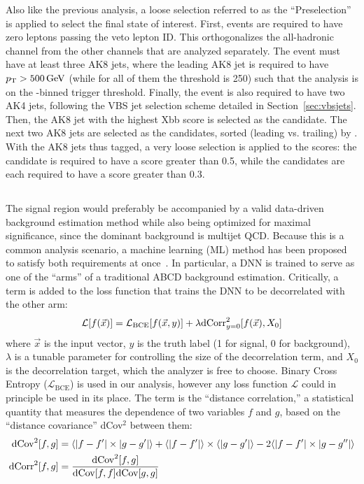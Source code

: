 Also like the previous analysis, a loose selection referred to as the ``Preselection'' is applied to select the final state of interest. 
First, events are required to have zero leptons passing the veto lepton ID. 
This orthogonalizes the all-hadronic channel from the other channels that are analyzed separately. 
The event must have at least three AK8 jets, where the leading AK8 jet is required to have $p_{\mathrm{T}} > 500\,\text{Ge\hspace{-.08em}V}$ (while for all of them the \pt threshold is 250\GeV) such that the analysis is on the \HT-binned trigger threshold. 
Finally, the event is also required to have two AK4 jets, following the VBS jet selection scheme detailed in Section~\ref{sec:vbsjets}.
Then, the AK8 jet with the highest \ParticleNet Xbb score is selected as the \Htobb candidate. 
The next two AK8 jets are selected as the \Vtoqq candidates, sorted (leading vs. trailing) by \pt.
With the AK8 jets thus tagged, a very loose selection is applied to the \ParticleNet scores: the \Htobb candidate is required to have a \ParticleNet \Xtobb score greater than 0.5, while the \Vtoqq candidates are each required to have a \ParticleNet \XWtoqq score greater than 0.3.

\subsection{\ABCDNet}
The signal region would preferably be accompanied by a valid data-driven background estimation method while also being optimized for maximal significance, since the dominant background is multijet QCD.
Because this is a common analysis scenario, a machine learning (ML) method has been proposed to satisfy both requirements at once~\cite{AutoABCD}. 
In particular, a DNN is trained to serve as one of the ``arms'' of a traditional ABCD background estimation. 
Critically, a \dCorrSq term is added to the loss function that trains the DNN to be decorrelated with the other arm:
\begin{equation}
    \mathcal{L}[f(\vec{x})] = \mathcal{L}_\mathrm{BCE}[f(\vec{x}, y)] + \lambda\text{dCorr}^2_{y=0}[f(\vec{x}), X_0]
\end{equation}
where $\vec{x}$ is the input vector, $y$ is the truth label (1 for signal, 0 for background), $\lambda$ is a tunable parameter for controlling the size of the decorrelation term, and $X_0$ is the decorrelation target, which the analyzer is free to choose.
Binary Cross Entropy ($\mathcal{L}_\mathrm{BCE}$) is used in our analysis, however any loss function $\mathcal{L}$ could in principle be used in its place.
The \dCorrSq term is the ``distance correlation,'' a statistical quantity that measures the dependence of two variables $f$ and $g$, based on the ``distance covariance'' dCov$^2$ between them:
\begin{align}
    \text{dCov}^2[f,g] &= \langle|f-f'|\times|g-g'|\rangle + \langle|f-f'|\rangle\times\langle|g-g'|\rangle - 2\langle|f - f'|\times|g-g''|\rangle \\
    \text{dCorr}^2[f,g] &= \frac{\text{dCov}^2[f, g]}{\text{dCov}[f, f]\text{dCov}[g, g]} \label{dCorrEq}
\end{align}

